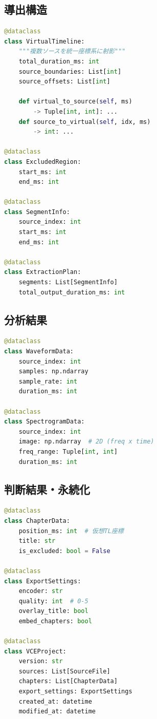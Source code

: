 \documentclass[10pt,a4paper,twocolumn]{ltjsarticle}
\begin{document}
\subsection{導出構造}

\begin{lstlisting}[language=Python]
@dataclass
class VirtualTimeline:
    """複数ソースを統一座標系に射影"""
    total_duration_ms: int
    source_boundaries: List[int]
    source_offsets: List[int]

    def virtual_to_source(self, ms)
        -> Tuple[int, int]: ...
    def source_to_virtual(self, idx, ms)
        -> int: ...

@dataclass
class ExcludedRegion:
    start_ms: int
    end_ms: int

@dataclass
class SegmentInfo:
    source_index: int
    start_ms: int
    end_ms: int

@dataclass
class ExtractionPlan:
    segments: List[SegmentInfo]
    total_output_duration_ms: int
\end{lstlisting}

\subsection{分析結果}

\begin{lstlisting}[language=Python]
@dataclass
class WaveformData:
    source_index: int
    samples: np.ndarray
    sample_rate: int
    duration_ms: int

@dataclass
class SpectrogramData:
    source_index: int
    image: np.ndarray  # 2D (freq x time)
    freq_range: Tuple[int, int]
    duration_ms: int
\end{lstlisting}

\subsection{判断結果・永続化}

\begin{lstlisting}[language=Python]
@dataclass
class ChapterData:
    position_ms: int  # 仮想TL座標
    title: str
    is_excluded: bool = False

@dataclass
class ExportSettings:
    encoder: str
    quality: int  # 0-5
    overlay_title: bool
    embed_chapters: bool

@dataclass
class VCEProject:
    version: str
    sources: List[SourceFile]
    chapters: List[ChapterData]
    export_settings: ExportSettings
    created_at: datetime
    modified_at: datetime
\end{lstlisting}
\end{document}
